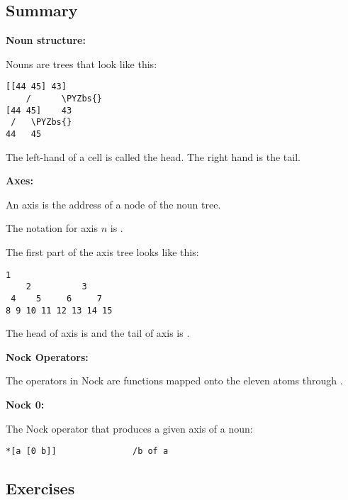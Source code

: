 \subsection{Summary}

\textbf{Noun structure:}

Nouns are trees that look like this:
\begin{framed_shaded}
\begin{Verbatim}[fontsize=\relsize{-2.5},commandchars=\\\{\}]
 [[44 45] 43]
    /      \PYZbs{}
[44 45]    43
 /   \PYZbs{}
44   45
\end{Verbatim}
\end{framed_shaded}
The left-hand of a cell is called the head. The right hand is the tail.

\textbf{Axes:}

An axis is the address of a node of the noun tree.

The notation for axis \(n\) is .

The first part of the axis tree looks like this:
\begin{framed_shaded}
\begin{Verbatim}[fontsize=\relsize{-2.5},commandchars=\\\{\}]
         1
    2          3
 4    5     6     7
8 9 10 11 12 13 14 15
\end{Verbatim}
\end{framed_shaded}
The head of axis  is  and the tail of axis  is .

\textbf{Nock Operators:}

The operators in Nock are functions mapped onto the eleven atoms  through .

\textbf{Nock 0:}

The Nock operator that produces a given axis of a noun:
\begin{framed_shaded}
\begin{Verbatim}[fontsize=\relsize{-2.5},commandchars=\\\{\}]
*[a [0 b]]               /b of a
\end{Verbatim}
\end{framed_shaded}

\subsection{Exercises}

